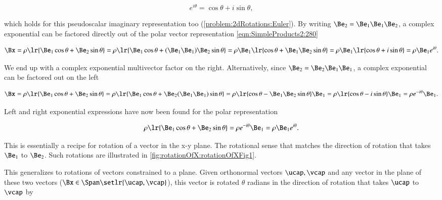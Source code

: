 \begin{dmath}\label{eqn:2dRotations:1140}
e^{i\theta} = \cos\theta + i \sin\theta,
\end{dmath}

which holds for this pseudoscalar imaginary representation too (\cref{problem:2dRotations:Euler}).
By writing \( \Be_2 = \Be_1 \Be_1 \Be_2 \),
a complex exponential can be factored directly out of the polar vector representation \cref{eqn:SimpleProducts2:280}

\begin{dmath}\label{eqn:SimpleProducts2:940}
\Bx
=
\rho \lr{ \Be_1 \cos\theta + \Be_2 \sin\theta }
=
\rho \lr{ \Be_1 \cos\theta + (\Be_1 \Be_1) \Be_2 \sin\theta }
=
\rho \Be_1 \lr{ \cos\theta + \Be_1 \Be_2 \sin\theta }
=
\rho \Be_1 \lr{ \cos\theta + i \sin\theta }
=
\rho \Be_1 e^{i\theta}.
\end{dmath}

We end up with a complex exponential multivector factor on the right.
Alternatively, since \( \Be_2 = \Be_2 \Be_1 \Be_1 \), a complex exponential can be factored out on the left

\begin{dmath}\label{eqn:SimpleProducts2:960}
\Bx
=
\rho \lr{ \Be_1 \cos\theta + \Be_2 \sin\theta }
=
\rho \lr{ \Be_1 \cos\theta + \Be_2 (\Be_1 \Be_1) \sin\theta }
=
\rho \lr{ \cos\theta - \Be_1 \Be_2 \sin\theta } \Be_1
=
\rho \lr{ \cos\theta - i \sin\theta } \Be_1
=
\rho e^{-i\theta} \Be_1.
\end{dmath}

Left and right exponential expressions have now been found for the polar representation

\begin{equation}\label{eqn:SimpleProducts2:1120}
\rho \lr{ \Be_1 \cos\theta + \Be_2 \sin\theta }
= \rho e^{-i\theta} \Be_1 = \rho \Be_1 e^{i\theta}.
\end{equation}

This is essentially a recipe for rotation of a vector in the x-y plane.  The rotational sense that matches the direction of rotation that takes
\( \Be_1 \) to \( \Be_2 \).  Such rotations are
illustrated in \cref{fig:rotationOfX:rotationOfXFig1}.

This generalizes to rotations of  vectors constrained to a plane.  Given orthonormal vectors \( \ucap, \vcap \) and any vector in the plane of these two vectors (\( \Bx \in \Span\setlr{\ucap,\vcap} \)), this vector is rotated \( \theta \) radians in the direction of rotation that takes \( \ucap \) to \( \vcap \) by


